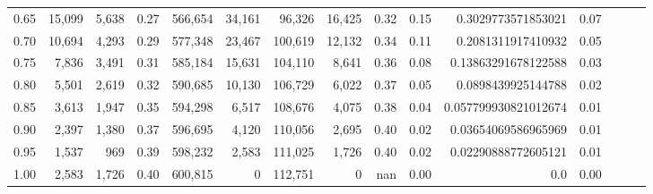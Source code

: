 \begin{tabular}{rrrrrrrrrrrrrrr}
0.65 &  15,099 &   5,638 &  0.27 &  566,654 &   34,161 &   96,326 &   16,425 &  0.32 &  0.15 &    0.3029773571853021 &      0.07 \\
0.70 &  10,694 &   4,293 &  0.29 &  577,348 &   23,467 &  100,619 &   12,132 &  0.34 &  0.11 &    0.2081311917410932 &      0.05 \\
0.75 &   7,836 &   3,491 &  0.31 &  585,184 &   15,631 &  104,110 &    8,641 &  0.36 &  0.08 &   0.13863291678122588 &      0.03 \\
0.80 &   5,501 &   2,619 &  0.32 &  590,685 &   10,130 &  106,729 &    6,022 &  0.37 &  0.05 &    0.0898439925144788 &      0.02 \\
0.85 &   3,613 &   1,947 &  0.35 &  594,298 &    6,517 &  108,676 &    4,075 &  0.38 &  0.04 &  0.057799930821012674 &      0.01 \\
0.90 &   2,397 &   1,380 &  0.37 &  596,695 &    4,120 &  110,056 &    2,695 &  0.40 &  0.02 &   0.03654069586965969 &      0.01 \\
0.95 &   1,537 &     969 &  0.39 &  598,232 &    2,583 &  111,025 &    1,726 &  0.40 &  0.02 &   0.02290888772605121 &      0.01 \\
1.00 &   2,583 &   1,726 &  0.40 &  600,815 &        0 &  112,751 &        0 &   nan &  0.00 &                   0.0 &      0.00 \\
\bottomrule
\end{tabular}
